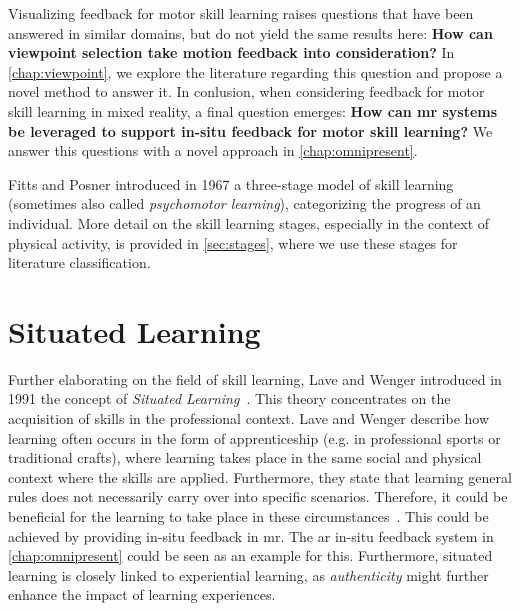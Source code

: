 Visualizing feedback for motor skill learning raises questions that have been answered in similar domains, but do not yield the same results here: \textbf{How can viewpoint selection take motion feedback into consideration?}
In \autoref{chap:viewpoint}, we explore the literature regarding this question and propose a novel method to answer it.
In conlusion, when considering feedback for motor skill learning in mixed reality, a final question emerges: \textbf{How can \acrlong{mr} systems be leveraged to support in-situ feedback for motor skill learning?}
We answer this questions with a novel approach in \autoref{chap:omnipresent}.


Fitts and Posner introduced in 1967 a three-stage model of skill learning (sometimes also called \emph{psychomotor learning}), categorizing the progress of an individual.
More detail on the skill learning stages, especially in the context of physical activity, is provided in \autoref{sec:stages}, where we use these stages for literature classification.

\section{Situated Learning \label{sec:situated}}
Further elaborating on the field of skill learning, Lave and Wenger introduced in 1991 the concept of \emph{Situated Learning}~\cite{lave:wenger:1991}.
This theory concentrates on the acquisition of skills in the professional context.
Lave and Wenger describe how learning often occurs in the form of apprenticeship (e.g. in professional sports or traditional crafts), where learning takes place in the same social and physical context where the skills are applied.
Furthermore, they state that learning general rules does not necessarily carry over into specific scenarios.
Therefore, it could be beneficial for the learning to take place in these circumstances~\cite[p. 34]{lave:wenger:1991}.
This could be achieved by providing in-situ feedback in \acrshort{mr}.
The \acrshort{ar} in-situ feedback system in \autoref{chap:omnipresent} could be seen as an example for this.
Furthermore, situated learning is closely linked to experiential learning, as \emph{authenticity} might further enhance the impact of learning experiences.